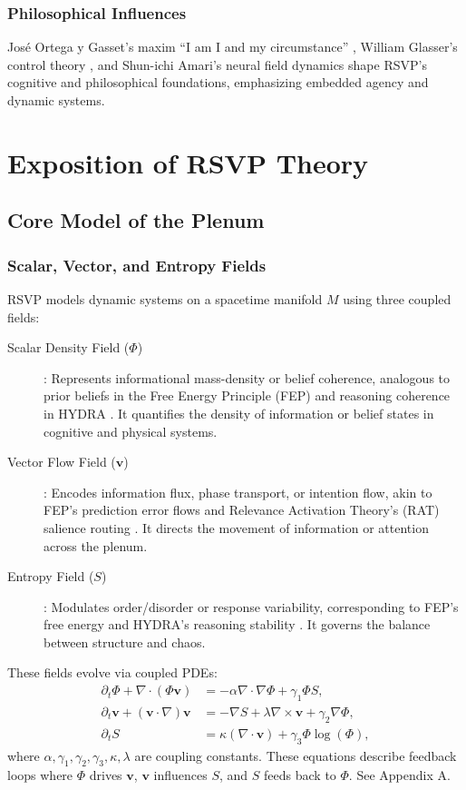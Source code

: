\documentclass[12pt]{report}
\newcommand{\PhiRSVP}{\Phi}
\newcommand{\vRSVP}{\mathbf{v}}
\newcommand{\SRSVP}{S}
\begin{document}
\section{Philosophical Influences}
José Ortega y Gasset’s maxim “I am I and my circumstance” \citep{Ortega1914}, William Glasser’s control theory \citep{Glasser1985}, and Shun-ichi Amari’s neural field dynamics \citep{Amari1977} shape RSVP’s cognitive and philosophical foundations, emphasizing embedded agency and dynamic systems.

\part{Exposition of RSVP Theory}

\chapter{Core Model of the Plenum}
\section{Scalar, Vector, and Entropy Fields}
RSVP models dynamic systems on a spacetime manifold \(M\) using three coupled fields:
\begin{description}
    \item[Scalar Density Field (\(\PhiRSVP\))]: Represents informational mass-density or belief coherence, analogous to prior beliefs in the Free Energy Principle (FEP) \citep{Friston2010} and reasoning coherence in HYDRA \citep{HYDRA2025}. It quantifies the density of information or belief states in cognitive and physical systems.
    \item[Vector Flow Field (\(\vRSVP\))]: Encodes information flux, phase transport, or intention flow, akin to FEP’s prediction error flows and Relevance Activation Theory’s (RAT) salience routing \citep{RAT2025}. It directs the movement of information or attention across the plenum.
    \item[Entropy Field (\(\SRSVP\))]: Modulates order/disorder or response variability, corresponding to FEP’s free energy and HYDRA’s reasoning stability \citep{Friston2010, HYDRA2025}. It governs the balance between structure and chaos.
\end{description}
These fields evolve via coupled PDEs:
\begin{align}
\partial_t \PhiRSVP + \nabla \cdot (\PhiRSVP \vRSVP) &= -\alpha \nabla \cdot \nabla \PhiRSVP + \gamma_1 \PhiRSVP \SRSVP, \label{eq:pde1} \\
\partial_t \vRSVP + (\vRSVP \cdot \nabla) \vRSVP &= -\nabla \SRSVP + \lambda \nabla \times \vRSVP + \gamma_2 \nabla \PhiRSVP, \label{eq:pde2} \\
\partial_t \SRSVP &= \kappa (\nabla \cdot \vRSVP) + \gamma_3 \PhiRSVP \log(\PhiRSVP), \label{eq:pde3}
\end{align}
where \(\alpha, \gamma_1, \gamma_2, \gamma_3, \kappa, \lambda\) are coupling constants. These equations describe feedback loops where \(\PhiRSVP\) drives \(\vRSVP\), \(\vRSVP\) influences \(\SRSVP\), and \(\SRSVP\) feeds back to \(\PhiRSVP\). See Appendix A.
\end{document}
